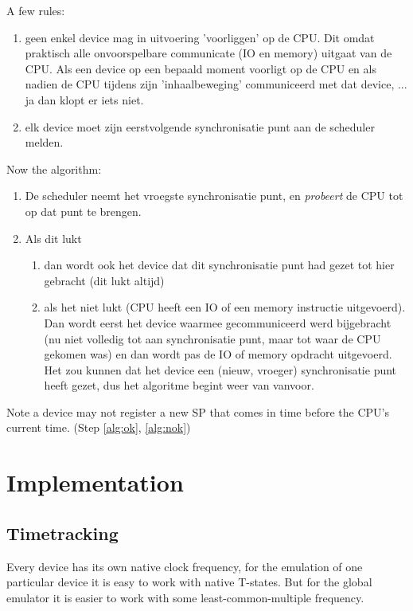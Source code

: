 \documentclass[11pt, a4paper]{report}
\begin{document}
A few rules:
\begin{enumerate}
\item %
geen enkel device mag in uitvoering 'voorliggen' op de CPU.
Dit omdat praktisch alle onvoorspelbare communicate (IO en memory) uitgaat
van de CPU. Als een device op een bepaald moment voorligt op de CPU en als
nadien de CPU tijdens zijn 'inhaalbeweging' communiceerd met dat device, ...
ja dan klopt er iets niet.

\item %
elk device moet zijn eerstvolgende synchronisatie punt
aan de scheduler melden.
\end{enumerate}

Now the algorithm:
\begin{enumerate}
\item De scheduler neemt het vroegste synchronisatie punt, en \textit{probeert}
de CPU tot op dat punt te brengen.
\item Als dit lukt
	\begin{enumerate}
	\item \label{alg:ok}
	dan wordt ook het device dat dit synchronisatie punt had gezet tot
	hier gebracht (dit lukt altijd)
	\item \label{alg:nok}
	als het niet lukt (CPU heeft een IO of een memory instructie
	uitgevoerd). Dan wordt eerst het device waarmee gecommuniceerd
	werd bijgebracht (nu niet volledig tot aan synchronisatie punt, maar tot
	waar de CPU gekomen was) en dan wordt pas de IO of memory opdracht
	uitgevoerd. Het zou kunnen dat het device een (nieuw, vroeger)
	synchronisatie punt heeft gezet, dus het algoritme begint weer van
	vanvoor.
	\end{enumerate}
\end{enumerate}

Note a device may not register a new SP that comes in time before the CPU's
current time. (Step \ref{alg:ok}, \ref{alg:nok})




\chapter{Implementation}

\section{Timetracking}

Every device has its own native clock frequency, for the emulation of one
particular device it is easy to work with native T-states. But for the
global emulator it is easier to work with some least-common-multiple frequency.
\end{document}
